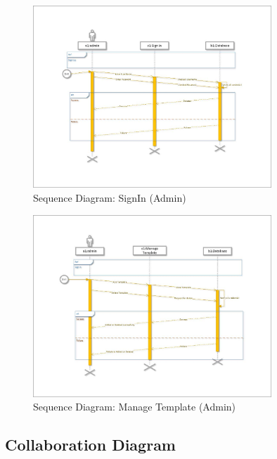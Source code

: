 \documentclass[12pt]{report}
\begin{document}
\begin{figure}[ht]
    \centering
    \includegraphics[width=0.8\textwidth]{Media/s1_Page_30.jpg} %
    \caption{Sequence Diagram: SignIn (Admin)}
    \label{fig:drawing1}
\end{figure}

\begin{figure}[ht]
    \centering
    \includegraphics[width=0.8\textwidth]{Media/s1_Page_32.jpg} %
    \caption{Sequence Diagram: Manage Template (Admin)}
    \label{fig:drawing1}
\end{figure}




\clearpage
\subsection{Collaboration Diagram}

\end{document}

